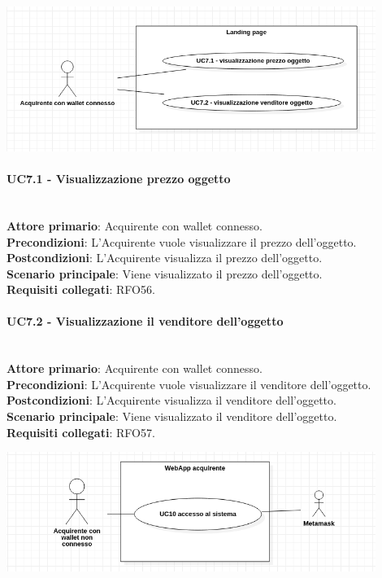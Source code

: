 \documentclass[a4paper, 12pt]{article}
\begin{document}
\includegraphics[width=0.9\textwidth]{UC7D}

\paragraph{UC7.1 - Visualizzazione prezzo oggetto}\\
\textbf{Attore primario}: Acquirente con wallet connesso.\\
\textbf{Precondizioni}: L'Acquirente vuole visualizzare il prezzo dell'oggetto.\\
\textbf{Postcondizioni}: L'Acquirente visualizza il prezzo dell'oggetto.\\
\textbf{Scenario principale}: Viene visualizzato il prezzo dell'oggetto.\\
\textbf{Requisiti collegati}: RFO56.\\

\paragraph{UC7.2 - Visualizzazione il venditore dell'oggetto}\\
\textbf{Attore primario}: Acquirente con wallet connesso.\\
\textbf{Precondizioni}: L'Acquirente vuole visualizzare il venditore dell'oggetto.\\
\textbf{Postcondizioni}: L'Acquirente visualizza il venditore dell'oggetto.\\
\textbf{Scenario principale}: Viene visualizzato il venditore dell'oggetto.\\
\textbf{Requisiti collegati}: RFO57.

\includegraphics[width=0.9\textwidth]{UC_WAA1}
\end{document}
